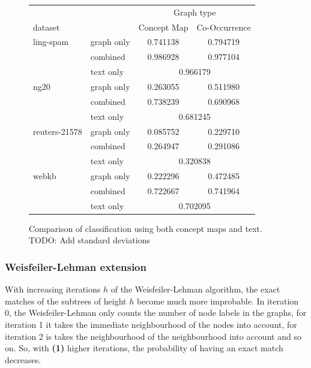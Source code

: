 \begin{figure}[ht]
\centering
\begin{tabular}{llcc}
  &  & \multicolumn{2}{c}{Graph type} \\
   dataset   & &  Concept Map &  Co-Occurrence \\
\midrule
ling-spam 
          & graph only &  0.741138 &  0.794719\\
          & combined &  0.986928 &  0.977104\\
          & text only & \multicolumn{2}{c}{ 0.966179 }\\
\midrule
ng20 
          & graph only &  0.263055 &  0.511980\\
          & combined &  0.738239 &  0.690968\\
          & text only & \multicolumn{2}{c}{ 0.681245 }\\
\midrule
reuters-21578 
          & graph only &  0.085752 &  0.229710\\
          & combined &  0.264947 &  0.291086\\
          & text only & \multicolumn{2}{c}{ 0.320838 }\\
\midrule
webkb 
          & graph only &  0.222296 &  0.472485\\
          & combined &  0.722667 &  0.741964\\
          & text only & \multicolumn{2}{c}{ 0.702095 }\\	
\bottomrule
\end{tabular}
\caption{Comparison of classification using both concept maps and text. TODO: Add standard deviations}%
\label{fig:results_comparison_combined}
\end{figure}



\subsubsection{Weisfeiler-Lehman extension}
With increasing iterations $h$ of the Weisfeiler-Lehman algorithm, the exact matches of the subtrees of height $h$ become much more improbable.
In iteration 0, the Weisfeiler-Lehman only counts the number of node labels in the graphs, for iteration 1 it takes the immediate neighbourhood of the nodes into account, for iteration 2 is takes the neighbourhood of the neighbourhood into account and so on.
So, with \textbf{(1)} higher iterations, the probability of having an exact match decreases.

